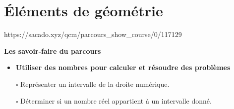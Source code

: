 \chapter{Éléments de géométrie}
{https://sacado.xyz/qcm/parcours_show_course/0/117129}
{


 \begin{CpsCol}
\textbf{Les savoir-faire du parcours}
 \begin{itemize}
 \item \textbf{Utiliser des nombres pour calculer et résoudre des problèmes}
	\item[$\square$] Représenter un intervalle de la droite numérique. 
	\item[$\square$]  Déterminer si un nombre réel appartient à un intervalle donné.
 \end{itemize}
 \end{CpsCol}

}

